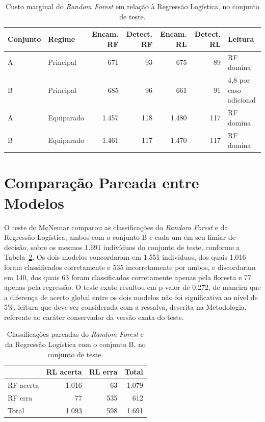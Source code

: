 \begin{table}[htb]
  \centering
  \caption{\label{tab:custo-marginal}Custo marginal do \textit{Random Forest} em relação à Regressão Logística, no conjunto de teste.}
  \footnotesize
  \setlength{\tabcolsep}{4pt}
  \begin{tabular}{llrrrrl}
    \hline
    Conjunto & Regime & Encam. RF & Detect. RF & Encam. RL & Detect. RL & Leitura \\ \hline
    A & Principal & 671 & 93 & 675 & 89 & RF domina \\
    B & Principal & 685 & 96 & 661 & 91 & 4,8 por caso adicional \\
    A & Equiparado & 1.457 & 118 & 1.480 & 117 & RF domina \\
    B & Equiparado & 1.461 & 117 & 1.470 & 117 & RF domina \\ \hline
  \end{tabular}
\end{table}

\section{Comparação Pareada entre Modelos}\label{sec:res-mcnemar}
O teste de McNemar comparou as classificações do \textit{Random Forest} e da Regressão Logística, ambos com o conjunto B e cada um em seu limiar de decisão, sobre os mesmos 1.691 indivíduos do conjunto de teste, conforme a Tabela~\ref{tab:mcnemar}. Os dois modelos concordaram em 1.551 indivíduos, dos quais 1.016 foram classificados corretamente e 535 incorretamente por ambos, e discordaram em 140, dos quais 63 foram classificados corretamente apenas pela floresta e 77 apenas pela regressão. O teste exato resultou em p-valor de 0,272, de maneira que a diferença de acerto global entre os dois modelos não foi significativa ao nível de 5\%, leitura que deve ser considerada com a ressalva, descrita na Metodologia, referente ao caráter conservador da versão exata do teste.

\begin{table}[htb]
  \centering
  \caption{\label{tab:mcnemar}Classificações pareadas do \textit{Random Forest} e da Regressão Logística com o conjunto B, no conjunto de teste.}
  \begin{tabular}{lrrr}
    \hline
    & RL acerta & RL erra & Total \\ \hline
    RF acerta & 1.016 & 63 & 1.079 \\
    RF erra & 77 & 535 & 612 \\ \hline
    Total & 1.093 & 598 & 1.691 \\ \hline
  \end{tabular}
\end{table}

